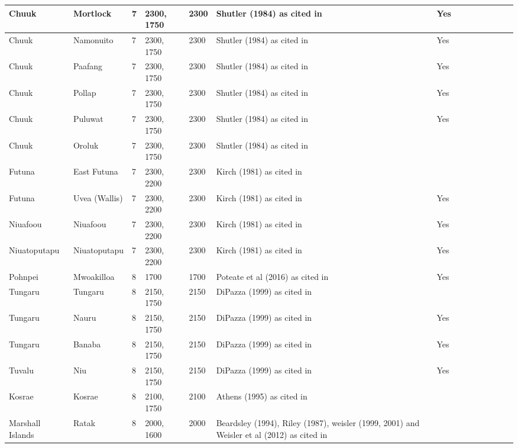 \documentclass[draft,10pt]{article} %
\begin{document}
\begin{landscape}
\begin{longtable}{| p{3cm}| p{4cm}| p{4cm}|p{2cm}|p{2cm}|p{2cm}|p{2cm}|p{2cm}|p{2cm}|p{2cm}|p{2cm}|p{2cm}|p{2cm}|p{2cm}}
 Chuuk & Mortlock & 7 & 2300, 1750 & 2300 & Shutler (1984) as cited in \citet{rieth_cochrane_2018} & Yes \\ \hline
 Chuuk & Namonuito & 7 & 2300, 1750 & 2300 & Shutler (1984) as cited in \citet{rieth_cochrane_2018} & Yes \\ \hline
 Chuuk & Paafang & 7 & 2300, 1750 & 2300 & Shutler (1984) as cited in \citet{rieth_cochrane_2018} & Yes \\ \hline
 Chuuk & Pollap & 7 & 2300, 1750 & 2300 & Shutler (1984) as cited in \citet{rieth_cochrane_2018} & Yes \\ \hline
 Chuuk & Puluwat & 7 & 2300, 1750 & 2300 & Shutler (1984) as cited in \citet{rieth_cochrane_2018} & Yes \\ \hline
 Chuuk & Oroluk & 7 & 2300, 1750 & 2300 & Shutler (1984) as cited in \citet{rieth_cochrane_2018} &   \\ \hline
 Futuna & East Futuna & 7 & 2300, 2200 & 2300 & Kirch (1981) as cited in \citet{rieth_cochrane_2018} &   \\ \hline
 Futuna & Uvea (Wallis) & 7 & 2300, 2200 & 2300 & Kirch (1981) as cited in \citet{rieth_cochrane_2018} & Yes \\ \hline
 Niuafoou & Niuafoou & 7 & 2300, 2200 & 2300 & Kirch (1981) as cited in \citet{rieth_cochrane_2018} & Yes \\ \hline
 Niuatoputapu & Niuatoputapu & 7 & 2300, 2200 & 2300 & Kirch (1981) as cited in \citet{rieth_cochrane_2018} & Yes \\ \hline
 Pohnpei & Mwoakilloa & 8 & 1700 & 1700 & Poteate et al (2016) as cited in \citet{levin_seikel_miles_2019} & Yes \\ \hline
 Tungaru & Tungaru & 8 & 2150, 1750 & 2150 & DiPazza (1999) as cited in \citet{rieth_cochrane_2018} &   \\ \hline
 Tungaru & Nauru & 8 & 2150, 1750 & 2150 & DiPazza (1999) as cited in \citet{rieth_cochrane_2018} & Yes \\ \hline
 Tungaru & Banaba & 8 & 2150, 1750 & 2150 & DiPazza (1999) as cited in \citet{rieth_cochrane_2018} & Yes \\ \hline
 Tuvalu & Niu & 8 & 2150, 1750 & 2150 & DiPazza (1999) as cited in \citet{rieth_cochrane_2018} & Yes \\ \hline
 Kosrae & Kosrae & 8 & 2100, 1750 & 2100 & Athens (1995) as cited in \citet{rieth_cochrane_2018} &   \\ \hline
 Marshall Islands & Ratak & 8 & 2000, 1600 & 2000 & Beardsley (1994), Riley (1987), weisler (1999, 2001) and Weisler et al (2012) as cited in \citet{rieth_cochrane_2018} &   \\ \hline

\end{longtable}
\end{landscape}
\end{document}

